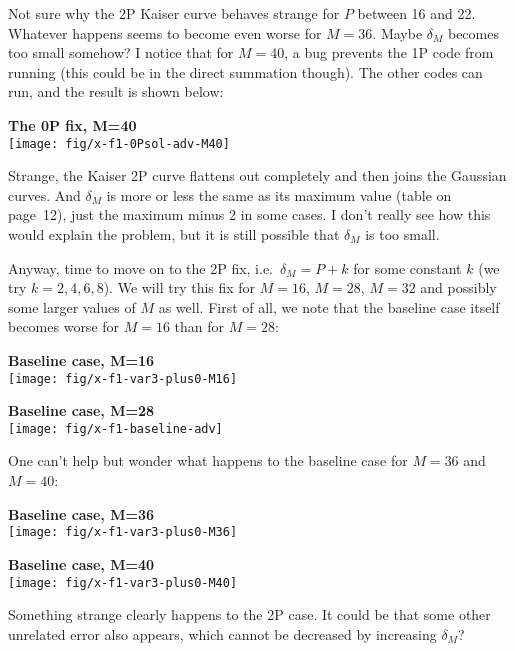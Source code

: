 \documentclass[a4paper,10pt]{article}
\begin{document}
Not sure why the 2P Kaiser curve behaves strange for $P$ between
16 and 22. Whatever happens seems to become even worse for
$M=36$. Maybe $\delta_M$ becomes too small somehow? I notice that
for $M=40$, a bug prevents the 1P code from running (this could
be in the direct summation though). The other codes can run, and
the result is shown below:
\begin{center}
  \textbf{The 0P fix, M=40}\\
  \texttt{[image: fig/x-f1-0Psol-adv-M40]}
\end{center}
Strange, the Kaiser 2P curve flattens out completely and then
joins the Gaussian curves. And $\delta_M$ is more or less the
same as its maximum value (table on page~12), just the maximum
minus 2 in some cases. I don't really see how this would explain
the problem, but it is still possible that $\delta_M$ is too
small.

Anyway, time to move on to the 2P fix, i.e.\ $\delta_M = P + k$
for some constant $k$ (we try $k=2, 4, 6, 8$). We will try this
fix for $M=16$, $M=28$, $M=32$ and possibly some larger values of
$M$ as well. First of all, we note that the baseline case itself
becomes worse for $M=16$ than for $M=28$:\\[\baselineskip]
\begin{minipage}{0.5\textwidth}\centering
  \textbf{Baseline case, M=16}\\
  \texttt{[image: fig/x-f1-var3-plus0-M16]}
\end{minipage}%
\begin{minipage}{0.5\textwidth}\centering
  \textbf{Baseline case, M=28}\\
  \texttt{[image: fig/x-f1-baseline-adv]}
\end{minipage}
One can't help but wonder what happens to the baseline case for
$M=36$ and $M=40$:\\[\baselineskip]
\begin{minipage}{0.5\textwidth}\centering
  \textbf{Baseline case, M=36}\\
  \texttt{[image: fig/x-f1-var3-plus0-M36]}
\end{minipage}%
\begin{minipage}{0.5\textwidth}\centering
  \textbf{Baseline case, M=40}\\
  \texttt{[image: fig/x-f1-var3-plus0-M40]}
\end{minipage}
Something strange clearly happens to the 2P case. It could be
that some other unrelated error also appears, which cannot be
decreased by increasing $\delta_M$?
\end{document}

